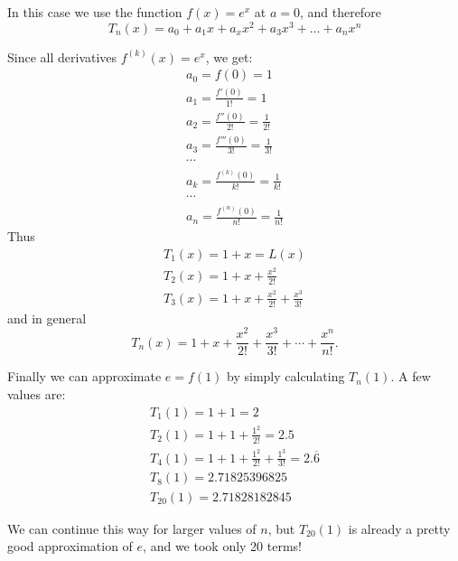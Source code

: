 \begin{solution}
In this case we use the function $f(x)=e^x$ at $a=0$, and therefore
\[ T_n(x)=a_0+a_1x+a_xx^2+a_3x^3+\ldots +a_nx^n \]

Since all derivatives $f^{(k)}(x)=e^x$, we get:
\[ \begin{array}{l}
a_0=f(0)=1 \\
a_1=\frac{f'(0)}{1!}=1 \\
a_2=\frac{f''(0)}{2!}=\frac{1}{2!} \\
a_3=\frac{f'''(0)}{3!}=\frac{1}{3!} \\
\cdots \\
a_k=\frac{f^{(k)}(0)}{k!}=\frac{1}{k!} \\
\cdots \\
a_n=\frac{f^{(n)}(0)}{n!}=\frac{1}{n!} 
\end{array} \]
Thus
\[ \begin{array}{l}
T_1(x)=1+x=L(x) \\
T_2(x)=1+x+\frac{x^2}{2!} \\
T_3(x)=1+x+\frac{x^2}{2!}+\frac{x^3}{3!}
\end{array} \]
and in general
\[ T_n(x)=1+x+\frac{x^2}{2!}+\frac{x^3}{3!}+\cdots +\frac{x^n}{n!}. \]

Finally we can approximate $e=f(1)$ by simply calculating $T_n(1)$. A few values are:
\[ \begin{array}{l}
T_1(1)=1+1=2 \\
T_2(1)=1+1+\frac{1^2}{2!}=2.5 \\
T_4(1)=1+1+\frac{1^2}{2!}+\frac{1^3}{3!}=2.\overline{6} \\
T_8(1)=2.71825396825 \\
T_{20}(1)=2.71828182845
\end{array} \]

We can continue this way for larger values of $n$, but $T_{20}(1)$ is already a pretty good approximation of $e$, and we took only 20 terms!
\end{solution}
%
%
